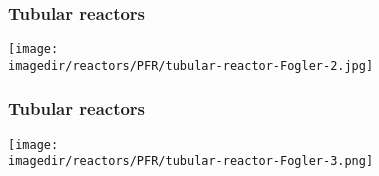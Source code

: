 \begin{frame}\frametitle{Tubular reactors}
	\begin{center}
		\texttt{[image: \\imagedir/reactors/PFR/tubular-reactor-Fogler-2.jpg]}
	\end{center}
\end{frame}

\begin{frame}\frametitle{Tubular reactors}
	\begin{center}
		\texttt{[image: \\imagedir/reactors/PFR/tubular-reactor-Fogler-3.png]}
	\end{center}
\end{frame}

\begin{comment}
\begin{frame}\frametitle{Tubular reactors}
	\vspace{-0.5em}
	\begin{itemize}
		\item	Assume turbulent flow $\Rightarrow$ modelled as plug (no radial variation in concentration)
		\item	Referred to as plug-flow reactor (PFR).
		\item	Starting point - general mole balance. $$F_{j0} - F_j + \int_Vr_j(V)dV = \frac{dN_j}{dt} = 0$$ Apply to differential volume: $$F_j|_V - F_j|_{V + \Delta V} + r_j\Delta V = 0$$
	\end{itemize}
\end{frame}

\begin{frame}\frametitle{Tubular reactors}
	Rearranging and dividing by $\Delta V$, $$\left[\frac{F_j|_{V+\Delta V} - F_j|_V}{\Delta V}\right] = r_j$$ Taking limit as $\Delta V \rightarrow 0$ $$\boxed{\frac{dF_j}{dV} = r_j}$$ Integral form: $$V_1 = \int_0^{V_1}dV = \int_{F_{j0}}^{F_{j1}}\frac{dF_j}{r_j}$$
\end{frame}

\begin{frame}\frametitle{Tubular reactors}
	\textbf{Remark 1}: Analysis does not assume constant cross-sectional area.

	$\Rightarrow$ applicable also to other geometries

	End up with same design equation.

	\textbf{Remark 2}: Furthermore, for liquids (why not for gases?) at steady state the volumetric flow rate is equal throughout the reactor, i.e., $v_o=v$
\end{frame}


\end{comment}
